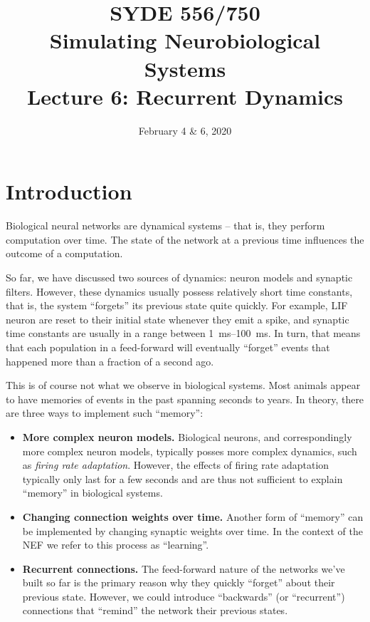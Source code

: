 \documentclass[10pt,letterpaper,oneside]{article}
\date{February 4 \& 6, 2020}
\title{SYDE 556/750 \\ Simulating Neurobiological Systems \\ Lecture 6: Recurrent Dynamics}
\begin{document}

\section{Introduction}


Biological neural networks are dynamical systems -- that is, they perform computation over time. The state of the network at a previous time influences the outcome of a computation.

So far, we have discussed two sources of dynamics: neuron models and synaptic filters. However, these dynamics usually possess relatively short time constants, that is, the system \enquote{forgets} its previous state quite quickly. For example, LIF neuron are reset to their initial state whenever they emit a spike, and synaptic time constants are usually in a range between \SIrange{1}{100}{\milli\second}. In turn, that means that each population in a feed-forward will eventually \enquote{forget} events that happened more than a fraction of a second ago.

This is of course not what we observe in biological systems. Most animals appear to have memories of events in the past spanning seconds to years. In theory, there are three ways to implement such \enquote{memory}:
\begin{itemize}
	\item \textbf{More complex neuron models.} Biological neurons, and correspondingly more complex neuron models, typically posses more complex dynamics, such as \emph{firing rate adaptation}. However, the effects of firing rate adaptation typically only last for a few seconds and are thus not sufficient to explain \enquote{memory} in biological systems.
	\item \textbf{Changing connection weights over time.} Another form of \enquote{memory} can be implemented by changing synaptic weights over time. In the context of the NEF we refer to this process as \enquote{learning}.
	\item \textbf{Recurrent connections.} The feed-forward nature of the networks we've built so far is the primary reason why they quickly \enquote{forget} about their previous state. However, we could introduce \enquote{backwards} (or \enquote{recurrent}) connections that \enquote{remind} the network their previous states.
\end{itemize}
\end{document}
